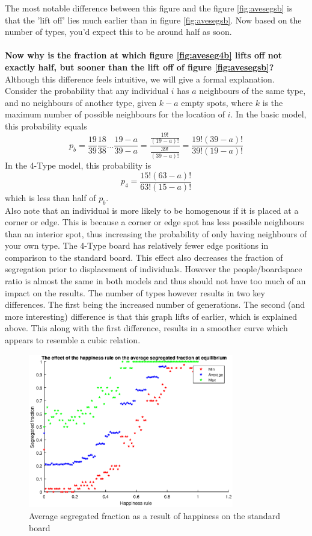 \documentclass{article}
\begin{document}
The most notable difference between this figure and the figure \ref{fig:avesegsb} is that the 'lift off' lies much earlier than in figure \ref{fig:avesegsb}. Now based on the number of types, you'd expect this to be around half as soon.\\\\
\textbf{Now why is the fraction at which figure \ref{fig:aveseg4b} lifts off not exactly half, but sooner than the lift off of figure \ref{fig:avesegsb}?}
Although this difference feels intuitive, we will give a formal explanation. Consider the probability that any individual $i$ has $a$ neighbours of the same type, and no neighbours of another type, given $k-a$ empty spots, where $k$ is the maximum number of possible neighbours for the location of $i$. In the basic model, this probability equals
\[
p_b = \frac{19}{39}\frac{18}{38}...\frac{19-a}{39-a} = \frac{\frac{19!}{(19-a)!}}{\frac{39!}{(39-a)!}} = \frac{19!(39-a)!}{39!(19-a)!}
\]
In the 4-Type model, this probability is
\[
p_4 = \frac{15!(63-a)!}{63!(15-a)!}
\]
which is less than half of $p_b$.\\
Also note that an individual is more likely to be homogenous if it is placed at a corner or edge. This is because a corner or edge spot has less possible neighbours than an interior spot, thus increasing the probability of only having neighbours of your own type. The 4-Type board has relatively fewer edge positions in comparison to the standard board. This effect also decreases the fraction of segregation prior to displacement of individuals.
However the people/boardspace ratio is almost the same in both models and thus should not have too much of an impact on the results.
The number of types however results in two key differences. The first being the increased number of generations. 
The second (and more interesting) difference is that this graph lifts of earlier, which is explained above. 
This along with the first difference, results in a smoother curve which appears to resemble a cubic relation.

\begin{figure}[H]
    \centering
    \includegraphics[width=0.8\textwidth]{habysegfrac_sb_1}
    \caption{Average segregated fraction as a result of happiness on the standard board}
    \label{fig:happysegsb}
\end{figure}
\end{document}
